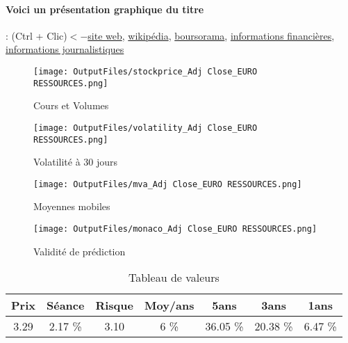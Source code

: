 \documentclass[11pt,a4paper]{report}%
\begin{document}
\paragraph{Voici un présentation graphique du titre} : (Ctrl + Clic)$<-$\href{https://www.euro-ressources-minoritaires.org/}{site web}, \href{https://fr.wikipedia.org/wiki/EURO_Ressources}{wikipédia}, \href{https://www.boursorama.com/cours/1rPEUR}{boursorama}, \href{https://www.qwant.com/?q=site:https:%2f%2fwww.easybourse.com%2faction-societe%2fEURO-RESSOURCES&t=web&client=ext-firefox-hp}{informations financières}, \href{https://bourse.lerevenu.com/cours-de-bourse/fiche-valeur-synthese/EURO-RESSOURCES/EUR-FR}{informations journalistiques}
\begin{figure}[!htb]
   \begin{minipage}{0.5\textwidth}
     \centering
     \texttt{[image: OutputFiles/stockprice\_Adj Close\_EURO RESSOURCES.png]}
     \caption{Cours et Volumes}\label{Fig:price_EURO RESSOURCES}
   \end{minipage}\hfill
   \begin{minipage}{0.5\textwidth}
     \centering
     \texttt{[image: OutputFiles/volatility\_Adj Close\_EURO RESSOURCES.png]}
     \caption{Volatilité à 30 jours}\label{Fig:volat_EURO RESSOURCES}
   \end{minipage}
\end{figure}
\begin{figure}[!htb]
   \begin{minipage}{0.5\textwidth}
     \centering
     \texttt{[image: OutputFiles/mva\_Adj Close\_EURO RESSOURCES.png]}
     \caption{Moyennes mobiles}\label{Fig:mva_EURO RESSOURCES}
   \end{minipage}\hfill
   \begin{minipage}{0.5\textwidth}
     \centering
     \texttt{[image: OutputFiles/monaco\_Adj Close\_EURO RESSOURCES.png]}
     \caption{Validité de prédiction}\label{Fig:prediction_EURO RESSOURCES}
   \end{minipage}
\end{figure}

\begin{table}[H]
  \centering
    \begin{tabular}{|c|c|c|c|c|c|c|}
    \hline
    Prix & Séance & Risque  & Moy/ans & 5ans & 3ans & 1ans \\
    \hline
    3.29 &    2.17 \%    & 3.10 & 6 \% & 36.05 \% & 20.38 \% & 6.47 \% \\
    \hline
    \end{tabular}%
        \label{tab:table_EURO RESSOURCES}%
      \caption{Tableau de valeurs}
\end{table}%
\end{document}
